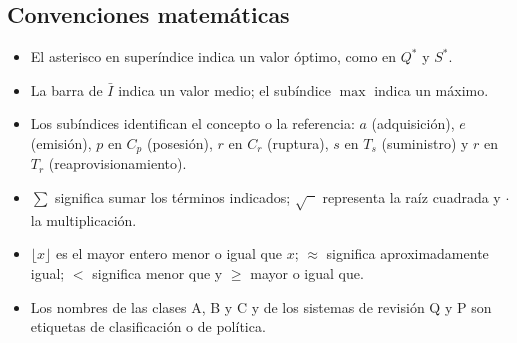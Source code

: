 \documentclass[11pt,a4paper]{article}
\begin{document}
\subsection{Convenciones matemáticas}
\begin{itemize}
    \item El asterisco en superíndice indica un valor óptimo, como en $Q^{*}$ y $S^{*}$.
    \item La barra de $\bar{I}$ indica un valor medio; el subíndice $\max$ indica un máximo.
    \item Los subíndices identifican el concepto o la referencia: $a$ (adquisición), $e$ (emisión), $p$ en $C_p$ (posesión), $r$ en $C_r$ (ruptura), $s$ en $T_s$ (suministro) y $r$ en $T_r$ (reaprovisionamiento).
    \item $\sum$ significa sumar los términos indicados; $\sqrt{\phantom{x}}$ representa la raíz cuadrada y $\cdot$ la multiplicación.
    \item $\lfloor x\rfloor$ es el mayor entero menor o igual que $x$; $\approx$ significa aproximadamente igual; $<$ significa menor que y $\geq$ mayor o igual que.
    \item Los nombres de las clases A, B y C y de los sistemas de revisión Q y P son etiquetas de clasificación o de política.
\end{itemize}
\end{document}
